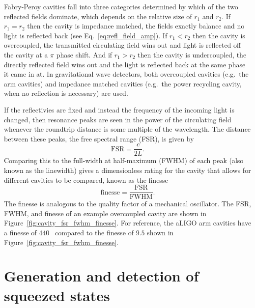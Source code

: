 \documentclass[aps,pra,superscriptaddress,reprint,nofootinbib]{revtex4-1}
\begin{document}
Fabry-Peroy cavities fall into three categories determined by which of the two reflected fields dominate, which depends on the relative size of $r_1$ and $r_2$. If $r_1 = r_2$ then the cavity is impedance matched, the fields exactly balance and no light is reflected back (see Eq.~\ref{eq:refl_field_amp}). If $r_1 < r_2$ then the cavity is overcoupled, the transmitted circulating field wins out and light is reflected off the cavity at a $\pi$ phase shift. And if $r_1 > r_2$ then the cavity is undercoupled, the directly reflected field wins out and the light is reflected back at the same phase it came in at. In gravitational wave detectors, both overcoupled cavities (e.g.\ the arm cavities) and impedance matched cavities (e.g.\ the power recycling cavity, when no reflection is necessary) are used.


If the reflectivies are fixed and instead the frequency of the incoming light is changed, then resonance peaks are seen in the power of the circulating field whenever the roundtrip distance is some multiple of the wavelength. The distance between these peaks, the free spectral range (FSR), is given by
\begin{equation}
\mathrm{FSR} = \frac{c}{2L}.
\end{equation}
Comparing this to the full-width at half-maximum (FWHM) of each peak (also known as the linewidth) gives a dimensionless rating for the cavity that allows for different cavities to be compared, known as the finesse
\begin{equation}
\mathrm{finesse} = \frac{\mathrm{FSR}}{\mathrm{FWHM}}.
\end{equation}
The finesse is analogous to the quality factor of a mechanical oscillator.
The FSR, FWHM, and finesse of an example overcoupled cavity are shown in Figure~\ref{fig:cavity_fsr_fwhm_finesse}.
For reference, the aLIGO arm cavities have a finesse of $440$~\cite{AdvancedLIGO:2015} compared to the finesse of $9.5$ shown in Figure~\ref{fig:cavity_fsr_fwhm_finesse}.


\section{Generation and detection of squeezed states}
\label{sec:squeezing}
\end{document}
